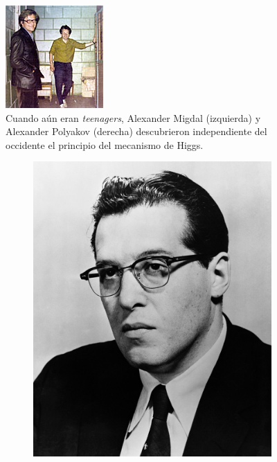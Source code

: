 \begin{figure}[h]
\centering
\includegraphics[scale=1]{images/polyakov_migdal.jpg}	
\caption{Cuando a\'un eran {\it teenagers}, Alexander
Migdal (izquierda) y Alexander Polyakov (derecha) descubrieron
independiente del occidente el principio del mecanismo de Higgs.}
\end{figure}


	\begin{figure}
			\begin{subfigure}{0.5\textwidth}
	\centering	
		\includegraphics[scale=0.15]{images/schwinger.jpg}
	\end{subfigure}
	\begin{subfigure}{0.5\textwidth}

\end{subfigure}
\end{figure}
